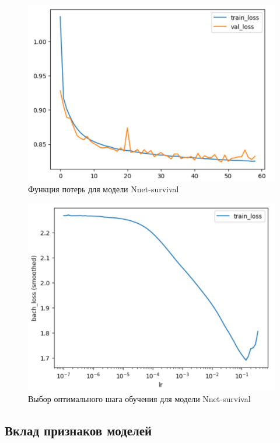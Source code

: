 \documentclass[a4paper,14pt,oneside,openany]{memoir}
\begin{document}
\begin{figure}[H]
	\includegraphics[width=\textwidth]{../figures/nnet_losses_30_epoch.png}
	\caption{Функция потерь для модели Nnet-survival}
\end{figure}

\begin{figure}[H]
	\includegraphics[width=\textwidth]{../figures/nnet_losses_30_epoch_lr.png}
	\caption{Выбор оптимального шага обучения для модели Nnet-survival}
\end{figure}

\subsection{Вклад признаков моделей}
\end{document}
